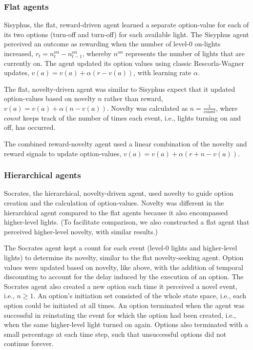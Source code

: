 \documentclass{article}
\begin{document}
\subsubsection{Flat agents}

Sisyphus, the flat, reward-driven agent learned a separate option-value for each of its two options (turn-off and turn-off) for each available light. The Sisyphus agent perceived an outcome as rewarding when the number of level-0 on-lights increased, $r_t = n_t^{on} - n_{t-1}^{on}$, whereby $n^{on}$ represents the number of lights that are currently on. The agent updated its option values using classic Rescorla-Wagner updates, $v(a) = v(a) + \alpha (r - v(a))$, with learning rate $\alpha$.

The flat, novelty-driven agent was similar to Sisyphus expect that it updated option-values based on novelty $n$ rather than reward, $v(a) = v(a) + \alpha (n - v(a))$. Novelty was calculated as $n = \frac{1}{count}$, where $count$ keeps track of the number of times each event, i.e., lights turning on and off, has occurred. 

The combined reward-novelty agent used a linear combination of the novelty and reward signals to update option-values, $v(a) = v(a) + \alpha (r + n - v(a))$. 


\subsubsection{Hierarchical agents}

Socrates, the hierarchical, novelty-driven agent, used novelty to guide option creation and the calculation of option-values. Novelty was different in the hierarchical agent compared to the flat agents because it also encompassed higher-level lights. (To facilitate comparison, we also constructed a flat agent that perceived higher-level novelty, with similar results.)

The Socrates agent kept a count for each event (level-0 lights and higher-level lights) to determine its novelty, similar to the flat novelty-seeking agent. Option values were updated based on novelty, like above, with the addition of temporal discounting to account for the delay induced by the execution of an option. The Socrates agent also created a new option each time it perceived a novel event, i.e., $n \geq 1$. An option's initiation set consisted of the whole state space, i.e., each option could be initiated at all times. An option terminated when the agent was successful in reinstating the event for which the option had been created, i.e., when the same higher-level light turned on again. Options also terminated with a small percentage at each time step, such that unsuccessful options did not continue forever. 
\end{document}
